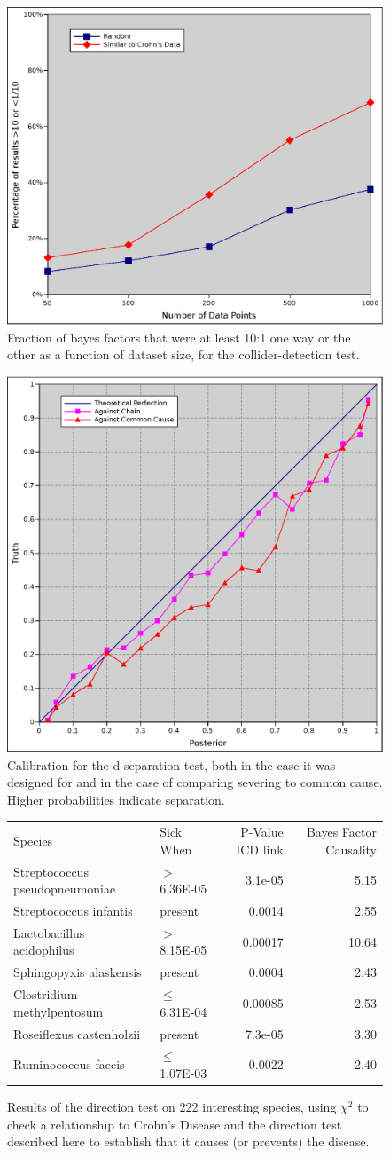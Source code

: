 \documentclass[letterpaper]{article}
\begin{document}
\begin{figure}
  \includegraphics[width=.5\textwidth]{usefullness}
  \caption{Fraction of bayes factors that were at least 10:1 one way
    or the other as a function of dataset size, for the
    collider-detection test.}
  \label{dir_use}
\end{figure}

\begin{figure}
  \includegraphics[width=.5\textwidth]{sever}
  \caption{Calibration for the d-separation test, both in the case it was
    designed for and in the case of comparing severing to common
    cause.  Higher probabilities indicate separation.}
  \label{sever}
\end{figure}

\begin{figure}
  \begin{tabular}{llrr}
    Species & Sick When & P-Value ICD link & Bayes Factor Causality \\
    Streptococcus pseudopneumoniae & $>$6.36E-05 & 3.1e-05 & 5.15 \\
    Streptococcus infantis & present & 0.0014 & 2.55 \\
    Lactobacillus acidophilus & $>$8.15E-05 & 0.00017 & 10.64 \\
    Sphingopyxis alaskensis & present & 0.0004 & 2.43 \\
    Clostridium methylpentosum & $\leq$6.31E-04 & 0.00085 & 2.53 \\
    Roseiflexus castenholzii & present & 7.3e-05 & 3.30 \\
    Ruminococcus faecis & $\leq$1.07E-03 & 0.0022 & 2.40 \\
  \end{tabular}
  \caption{Results of the direction test on 222 interesting species,
    using $\chi^2$ to check a relationship to Crohn's Disease and the
    direction test described here to establish that it causes (or
    prevents) the disease.}
  \label{dir_tab}
\end{figure}
\end{document}
